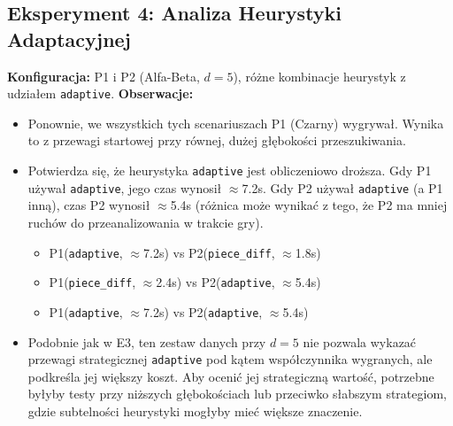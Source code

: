 \documentclass[11pt,a4paper]{article}
\newcommand{\code}[1]{\texttt{#1}} %
\begin{document}
\subsection{Eksperyment 4: Analiza Heurystyki Adaptacyjnej}
\textbf{Konfiguracja:} P1 i P2 (Alfa-Beta, $d=5$), różne kombinacje heurystyk z udziałem \code{adaptive}.
\textbf{Obserwacje:}
\begin{itemize}
    \item Ponownie, we wszystkich tych scenariuszach P1 (Czarny) wygrywał. Wynika to z przewagi startowej przy równej, dużej głębokości przeszukiwania.
    \item Potwierdza się, że heurystyka \code{adaptive} jest obliczeniowo droższa. Gdy P1 używał \code{adaptive}, jego czas wynosił $\approx$7.2s. Gdy P2 używał \code{adaptive} (a P1 inną), czas P2 wynosił $\approx$5.4s (różnica może wynikać z tego, że P2 ma mniej ruchów do przeanalizowania w trakcie gry).
        \begin{itemize}
            \item P1(\code{adaptive}, $\approx$7.2s) vs P2(\code{piece\_diff}, $\approx$1.8s)
            \item P1(\code{piece\_diff}, $\approx$2.4s) vs P2(\code{adaptive}, $\approx$5.4s)
            \item P1(\code{adaptive}, $\approx$7.2s) vs P2(\code{adaptive}, $\approx$5.4s)
        \end{itemize}
    \item Podobnie jak w E3, ten zestaw danych przy $d=5$ nie pozwala wykazać przewagi strategicznej \code{adaptive} pod kątem współczynnika wygranych, ale podkreśla jej większy koszt. Aby ocenić jej strategiczną wartość, potrzebne byłyby testy przy niższych głębokościach lub przeciwko słabszym strategiom, gdzie subtelności heurystyki mogłyby mieć większe znaczenie.
\end{itemize}
\end{document}
